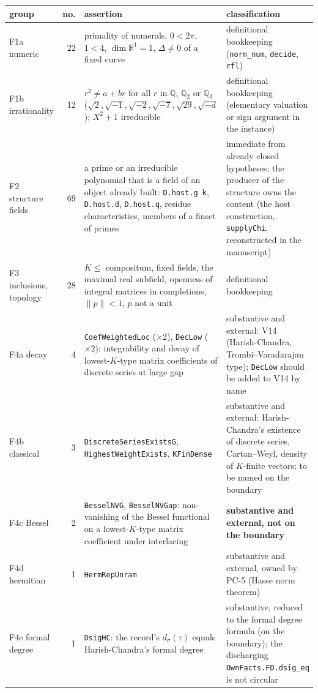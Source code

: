 \documentclass[11pt]{article}
\newcommand{\lean}[1]{\nolinkurl{#1}}
\newcommand{\PC}[1]{PC-#1}
\theoremstyle{remark}
\begin{document}
\begin{center}\small
\begin{longtable}{>{\raggedright}p{2.7cm}r>{\raggedright}p{5.2cm}>{\raggedright\arraybackslash}p{5.3cm}}
\toprule
group & no. & assertion & classification\\
\midrule\endhead
F1a numeric & 22 & primality of numerals, $0<2\pi$, $1<4$, $\dim\mathbb R^1=1$, $\Delta\ne0$ of a fixed curve & definitional bookkeeping (\lean{norm_num}, \lean{decide}, \lean{rfl})\\
F1b irrationality & 12 & $r^2\ne a+br$ for all $r$ in $\mathbb Q$, $\mathbb Q_2$ or $\mathbb Q_3$ ($\sqrt2,\sqrt{-1},\sqrt{-2},\sqrt{-7},\sqrt{29},\sqrt{-d}$); $X^2+1$ irreducible & definitional bookkeeping (elementary valuation or sign argument in the instance)\\
F2 structure fields & 69 & a prime or an irreducible polynomial that is a field of an object already built: \lean{D.host.g}~\lean{k}, \lean{D.host.d}, \lean{D.host.q}, residue characteristics, members of a finset of primes & immediate from already closed hypotheses; the producer of the structure owns the content (the host construction, \lean{supplyChi}, reconstructed in the manuscript)\\
F3 inclusions, topology & 28 & $K\le$ compositum, fixed fields, the maximal real subfield, openness of integral matrices in completions, $\lVert p\rVert<1$, $p$ not a unit & definitional bookkeeping\\
F4a decay & 4 & \lean{CoefWeightedLoc} ($\times2$), \lean{DecLow} ($\times2$): integrability and decay of lowest-$K$-type matrix coefficients of discrete series at large gap & substantive and external: V14 (Harish-Chandra, Trombi--Varadarajan type); \lean{DecLow} should be added to V14 by name\\
F4b classical & 3 & \lean{DiscreteSeriesExistsG}, \lean{HighestWeightExists}, \lean{KFinDense} & substantive and external: Harish-Chandra's existence of discrete series, Cartan--Weyl, density of $K$-finite vectors; to be named on the boundary\\
F4c Bessel & 2 & \lean{BesselNVG}, \lean{BesselNVGap}: non-vanishing of the Bessel functional on a lowest-$K$-type matrix coefficient under interlacing & \textbf{substantive and external, not on the boundary}\\
F4d hermitian & 1 & \lean{HermRepUnram} & substantive and external, owned by \PC{5} (Hasse norm theorem)\\
F4e formal degree & 1 & \lean{DsigHC}: the record's $d_\sigma(\tau)$ equals Harish-Chandra's formal degree & substantive, reduced to the formal degree formula (on the boundary); the discharging \lean{OwnFacts.FD.dsig_eq} is not circular\\

\end{longtable}
\end{center}
\end{document}
